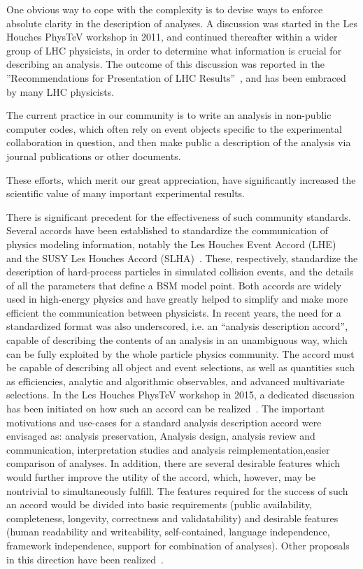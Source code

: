 \documentclass[11pt]{cernrep}
\begin{document}
One obvious way to cope with the complexity is to devise ways to enforce absolute clarity in the description of analyses.
A discussion was started in the Les Houches PhysTeV workshop in 2011, and continued
thereafter within a wider group of LHC physicists, in order to determine what information is
crucial for describing an analysis. The outcome of this discussion was reported in the
''Recommendations for Presentation of LHC Results''~\cite{Brooijmans:2012yi,Kraml:2012sg,Brooijmans:2016vro}, and has been embraced by many LHC physicists.

The current practice in our community is to write an analysis in non-public computer codes,
which often rely on event objects specific to the experimental collaboration in question,
and then make public a description of the analysis via journal publications or other documents.

These efforts, which merit our great appreciation,
have significantly increased the scientific value of many important experimental results.

There is significant precedent for the effectiveness of such community standards. Several
accords have been established to standardize the communication of physics modeling information,
notably the Les Houches Event Accord (LHE)~\cite{Boos:2001cv,Alwall:2006yp} and the SUSY Les Houches Accord (SLHA)~\cite{Allanach:2008qq,Skands:2003cj}.
These, respectively, standardize the description of hard-process
particles in simulated collision events, and the details of all the parameters that define a BSM model point.
Both accords are widely used in high-energy physics and have greatly helped to
simplify and make more efficient the communication between physicists.
In recent years, the need for a standardized format was also underscored, i.e. an “analysis description
accord”, capable of describing the contents of an analysis in an unambiguous way, which can
be fully exploited by the whole particle physics community.  The accord must be capable of
describing all object and event selections, as well as quantities such as efficiencies, analytic and
algorithmic observables, and advanced multivariate selections.
In the Les Houches PhysTeV workshop in 2015, a dedicated discussion has been initiated
on how such an accord can be realized~\cite{Brooijmans:2016vro}.
The important motivations and use-cases for a standard analysis description accord were envisaged as:
analysis preservation, Analysis design, analysis review and communication, interpretation studies and analysis reimplementation,easier comparison of analyses.
In addition, there are several desirable features which would further improve the utility
of the accord, which, however, may be nontrivial to simultaneously fulfill.  
The features required for the success of such an accord would be divided into basic requirements (public availability, completeness, longevity, correctness and validatability) and desirable features (human readability and writeability, self-contained, language independence, framework independence, support for combination of analyses).
Other proposals in this direction have been realized~\cite{Collaboration:2242860,recasting_atlas}.
\end{document}
